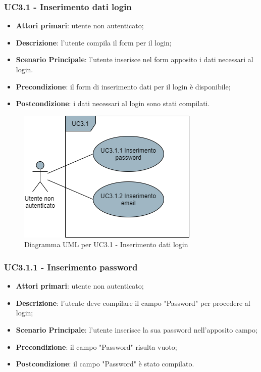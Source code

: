 \subsubsection{UC3.1 - Inserimento dati login}
\begin{itemize}
\item \textbf{Attori primari}: utente non autenticato;
\item \textbf{Descrizione}: l'utente compila il form per il login;
\item \textbf{Scenario Principale}: l'utente inserisce nel form apposito i dati necessari al login.
\item \textbf{Precondizione}: il form di inserimento dati per il login è disponibile;
\item \textbf{Postcondizione}: i dati necessari al login sono stati compilati.
\end{itemize}

\begin{figure}[H]
\centering
\includegraphics[scale=0.6]{res/UseCase/Immagini/InserimentoDatiLogin}
\caption{Diagramma UML per UC3.1 - Inserimento dati login}
\end{figure}

\subsubsection{UC3.1.1 - Inserimento password}
\begin{itemize}
\item \textbf{Attori primari}: utente non autenticato;
\item \textbf{Descrizione}: l'utente deve compilare il campo "Password" per procedere al login;
\item \textbf{Scenario Principale}: l'utente inserisce la sua password nell'apposito campo;
\item \textbf{Precondizione}: il campo "Password" risulta vuoto;
\item \textbf{Postcondizione}: il campo "Password" è stato compilato.
\end{itemize}

